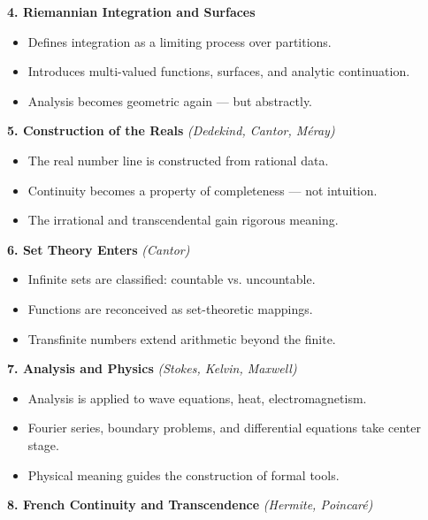 \documentclass[9pt]{article}
\begin{document}
\bigskip

\textbf{4. Riemannian Integration and Surfaces}

\begin{itemize}
  \item Defines integration as a limiting process over partitions.
  \item Introduces multi-valued functions, surfaces, and analytic continuation.
  \item Analysis becomes geometric again — but abstractly.
\end{itemize}

\bigskip

\textbf{5. Construction of the Reals} \hfill \textit{(Dedekind, Cantor, Méray)}

\begin{itemize}
  \item The real number line is constructed from rational data.
  \item Continuity becomes a property of completeness — not intuition.
  \item The irrational and transcendental gain rigorous meaning.
\end{itemize}

\bigskip

\textbf{6. Set Theory Enters} \hfill \textit{(Cantor)}

\begin{itemize}
  \item Infinite sets are classified: countable vs. uncountable.
  \item Functions are reconceived as set-theoretic mappings.
  \item Transfinite numbers extend arithmetic beyond the finite.
\end{itemize}

\bigskip

\textbf{7. Analysis and Physics} \hfill \textit{(Stokes, Kelvin, Maxwell)}

\begin{itemize}
  \item Analysis is applied to wave equations, heat, electromagnetism.
  \item Fourier series, boundary problems, and differential equations take center stage.
  \item Physical meaning guides the construction of formal tools.
\end{itemize}

\bigskip

\textbf{8. French Continuity and Transcendence} \hfill \textit{(Hermite, Poincaré)}
\end{document}
